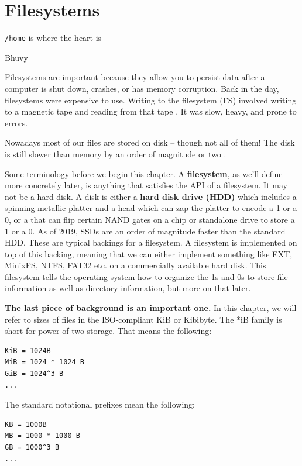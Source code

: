 \chapter{Filesystems}

\epigraph{\texttt{/home} is where the heart is}{Bhuvy}

Filesystems are important because they allow you to persist data after a computer is shut down, crashes, or has memory corruption.
Back in the day, filesystems were expensive to use.
Writing to the filesystem (FS) involved writing to a magnetic tape and reading from that tape .
It was slow, heavy, and prone to errors.

Nowadays most of our files are stored on disk -- though not all of them!
The disk is still slower than memory by an order of magnitude or two .

Some terminology before we begin this chapter.
A \textbf{filesystem}, as we'll define more concretely later, is anything that satisfies the API of a filesystem.
It may not be a hard disk.
A disk is either a \textbf{hard disk drive (HDD)} which includes a spinning metallic platter and a head which can zap the platter to encode a 1 or a 0, or a  that can flip certain NAND gates on a chip or standalone drive to store a 1 or a 0.
As of 2019, SSDs are an order of magnitude faster than the standard HDD.
These are typical backings for a filesystem.
A filesystem is implemented on top of this backing, meaning that we can either implement something like EXT, MinixFS, NTFS, FAT32 etc. on a commercially available hard disk.
This filesystem tells the operating system how to organize the 1s and 0s to store file information as well as directory information, but more on that later.

\textbf{The last piece of background is an important one.} In this chapter, we will refer to sizes of files in the ISO-compliant KiB or Kibibyte.
The *iB family is short for power of two storage.
That means the following:

\begin{verbatim}
KiB = 1024B
MiB = 1024 * 1024 B
GiB = 1024^3 B
...
\end{verbatim}

The standard notational prefixes mean the following:

\begin{verbatim}
KB = 1000B
MB = 1000 * 1000 B
GB = 1000^3 B
...
\end{verbatim}

